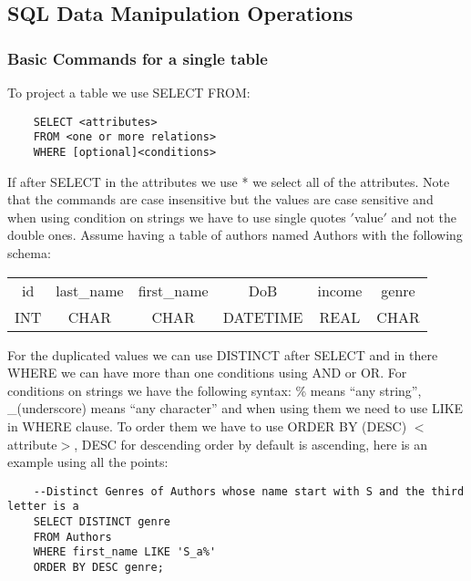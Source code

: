 \documentclass[a4page, 11pt]{article}
\begin{document}
\subsection{SQL Data Manipulation Operations}

\subsubsection{Basic Commands for a single table}
To project a table we use SELECT FROM:

\begin{lstlisting}
	SELECT <attributes>
	FROM <one or more relations>
	WHERE [optional]<conditions>
\end{lstlisting}

If after SELECT in the attributes we use * we select all of the attributes. Note that the commands are case insensitive but the values are case sensitive and when using condition on strings we have to use single quotes $'$value$'$ and not the double ones.\newline
Assume having a table of authors named Authors with the following schema:
\begin{table}[h]
	\centering
	\begin{tabular}{c c c c c c}
		id & last\_name & first\_name & DoB & income & genre\\
		INT & CHAR & CHAR & DATETIME & REAL & CHAR\\
	\end{tabular}
\end{table}


For the duplicated values we can use DISTINCT after SELECT and in there WHERE we can have more than one conditions using AND or OR.\newline
For conditions on strings we have the following syntax: \% means ``any string'', \_(underscore) means ``any character'' and when using them we need to use LIKE in WHERE clause. To order them we have to use ORDER BY (DESC) $<$attribute$>$, DESC for descending order by default is ascending, here is an example using all the points:

\begin{lstlisting}
	--Distinct Genres of Authors whose name start with S and the third letter is a
	SELECT DISTINCT genre
	FROM Authors
	WHERE first_name LIKE 'S_a%'
	ORDER BY DESC genre;
\end{lstlisting}
\end{document}
